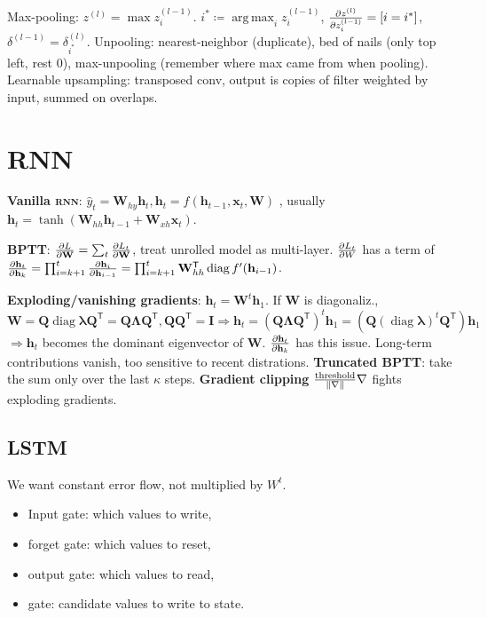 \documentclass[11pt,landscape,a4paper,fleqn]{article}
\newcommand*{\tran}{^{\mathsf{T}}} %
\DeclareMathOperator{\diag}{\mathrm{diag}}
\DeclareMathOperator*{\argmax}{arg\,max}
\def\myvector#1{\mathbf{#1}}
\def\vh{{\myvector{h}}}
\def\vx{{\myvector{x}}}
\def\mymatrix#1{\mathbf{#1}}
\def\mI{{\mymatrix{I}}}
\def\mQ{{\mymatrix{Q}}}
\def\mW{{\mymatrix{W}}}
\begin{document}
\begin{multicols*}{4}
Max-pooling: $z^{(l)} = \max z_i^{(l - 1)}$. $i^* \coloneqq \argmax_i z_i^{(l - 1)}$,
$\pdv{z^{(l)}}{z_i^{(l - 1)}} = [i = i^*]$, $\delta^{(l - 1)} = \delta^{(l)}_{i^*}$.
Unpooling: nearest-neighbor (duplicate), bed of nails (only top left, rest 0), max-unpooling (remember where max came from when pooling).
Learnable upsampling: transposed conv, output is copies of filter weighted by input, summed on overlaps.

\section{RNN}

\textbf{Vanilla \textsc{rnn}}: $\hat{y}_t = \mW_{hy} \vh_t, \vh_t = f(\vh_{t-1}, \vx_t, \mW)$
, usually $\vh_t = \tanh(\mW_{hh} \vh_{t-1} + \mW_{xh}\vx_t)$.

\textbf{BPTT}: $\pdv{L}{\mW} = \sum_t \pdv{L_t}{\mW}$, treat unrolled model as multi-layer.
$\pdv{L_t}{W}$ has a term of $\pdv{\vh_t}{\vh_k} = \prod_{i = k + 1}^t \pdv{\vh_i}{\vh_{i-1}}
= \prod_{i = k + 1}^t \mW_{hh}\tran \diag f'(\vh_{i-1})$.

\textbf{Exploding/vanishing gradients}: $\vh_t = \mW^t \vh_1$.
If $\mW$ is diagonaliz., $\mW = \mQ \diag \bm\lambda \mQ\tran = \mQ \bm\Lambda \mQ\tran, \mQ \mQ\tran = \mI
\Rightarrow \vh_t = (\mQ\bm\Lambda \mQ\tran)^t \vh_1 = (\mQ (\diag \bm\lambda)^t \mQ\tran) \vh_1$
$\Rightarrow \vh_t$ becomes the dominant eigenvector of $\mW$.
$\pdv{\vh_t}{\vh_k}$ has this issue.
Long-term contributions vanish, too sensitive to recent distrations.
\textbf{Truncated BPTT}: take the sum only over the last $\kappa$ steps.
\textbf{Gradient clipping} $\frac{\mathrm{threshold}}{\norm{\nabla}} \nabla$ fights exploding gradients.


\subsection{LSTM}
We want constant error flow, not multiplied by $W^t$.
\begin{itemize}
    \item Input gate: which values to write,
    \item forget gate: which values to reset,
    \item output gate: which values to read,
    \item gate: candidate values to write to state.
\end{itemize}


\end{multicols*}
\end{document}

